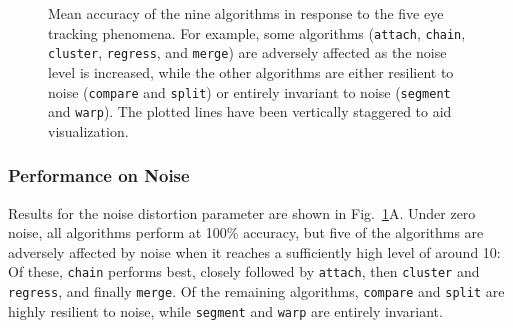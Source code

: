 \documentclass[doc,biblatex]{apa7}
\begin{document}
	\begin{figure}
	\vspace*{2pt}
	\caption{Mean accuracy of the nine algorithms in response to the five eye tracking phenomena. For example, some algorithms (\texttt{attach}, \texttt{chain}, \texttt{cluster}, \texttt{regress}, and \texttt{merge}) are adversely affected as the noise level is increased, while the other algorithms are either resilient to noise (\texttt{compare} and \texttt{split}) or entirely invariant to noise (\texttt{segment} and \texttt{warp}). The plotted lines have been vertically staggered to aid visualization.}
	\label{fig05}
	\end{figure}

\subsubsection{Performance on Noise}

Results for the noise distortion parameter are shown in Fig.~\ref{fig05}A. Under zero noise, all algorithms perform at 100\% accuracy, but five of the algorithms are adversely affected by noise when it reaches a sufficiently high level of around 10: Of these, \texttt{chain} performs best, closely followed by \texttt{attach}, then \texttt{cluster} and \texttt{regress}, and finally \texttt{merge}. Of the remaining algorithms, \texttt{compare} and \texttt{split} are highly resilient to noise, while \texttt{segment} and \texttt{warp} are entirely invariant.
\end{document}
